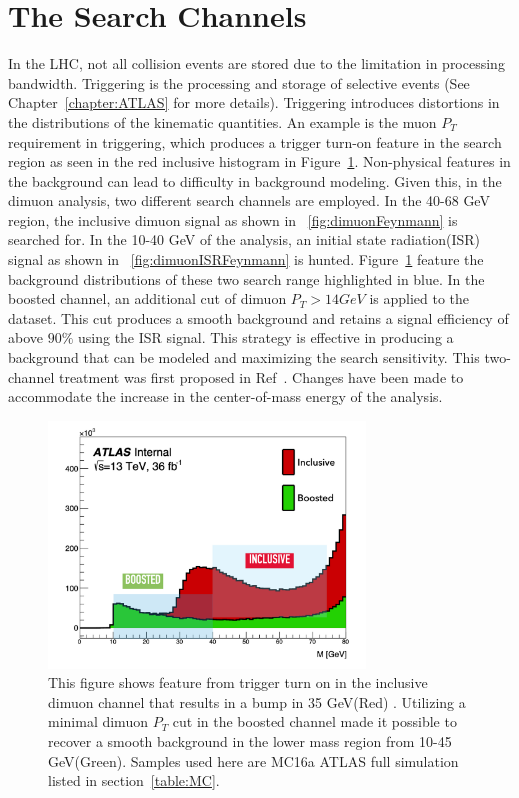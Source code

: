 \section{The Search Channels}
In the LHC, not all collision events are stored due to the limitation in processing bandwidth. Triggering is the processing and storage of selective events (See Chapter~\ref{chapter:ATLAS} for more details). Triggering introduces distortions in the distributions of the kinematic quantities. An example is the muon $P_{T}$ requirement in triggering, which produces a trigger turn-on feature in the search region as seen in the red inclusive histogram in Figure~\ref{fig:turnon}.
Non-physical features in the background can lead to difficulty in background modeling. Given this, in the dimuon analysis, two different search channels are employed. In the 40-68 GeV region, the inclusive dimuon signal as shown in ~\ref{fig:dimuonFeynmann} is searched for. In the 10-40 GeV of the analysis, an initial state radiation(ISR) signal as shown in ~\ref{fig:dimuonISRFeynmann} is hunted. Figure~\ref{fig:turnon} feature the background distributions of these two search range highlighted in blue. In the
boosted channel, an additional cut of dimuon $P_{T}>14 GeV$ is applied to the dataset. This cut produces a smooth background and retains a signal efficiency of above $90\%$ using the ISR signal. This strategy is effective in producing a background that can be modeled and maximizing the search sensitivity. 
This two-channel treatment was first proposed in Ref~\cite{2014}. Changes have been made to accommodate the increase in the center-of-mass energy of the analysis. 

\begin{figure}[!htb]
    \begin{center}
        \includegraphics[width=0.75\textwidth]{figures/chapter_dimuon/turnon}
        \caption{
        This figure shows feature from trigger turn on in the inclusive dimuon channel that results in a bump in 35 GeV(Red) . Utilizing a minimal dimuon $P_{T}$ cut in the boosted channel made it possible to recover a smooth background in the lower mass region from 10-45 GeV(Green). Samples used here are MC16a ATLAS full simulation listed in section~\ref{table:MC}.
        }
        \label{fig:turnon}
    \end{center}
\end{figure}
\FloatBarrier

